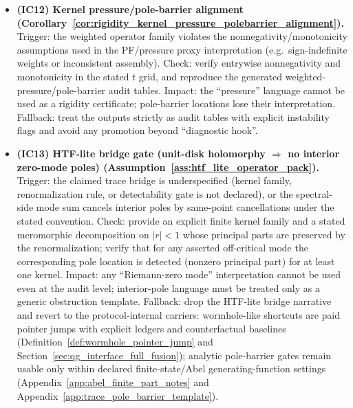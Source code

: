 \begin{itemize}
\item \textbf{(IC12) Kernel pressure/pole-barrier alignment (Corollary~\ref{cor:rigidity_kernel_pressure_polebarrier_alignment}).}
  Trigger: the weighted operator family violates the nonnegativity/monotonicity assumptions used in the PF/pressure proxy interpretation (e.g.\ sign-indefinite weights or inconsistent assembly).
  Check: verify entrywise nonnegativity and monotonicity in the stated $t$ grid, and reproduce the generated weighted-pressure/pole-barrier audit tables.
  Impact: the ``pressure'' language cannot be used as a rigidity certificate; pole-barrier locations lose their interpretation.
  Fallback: treat the outputs strictly as audit tables with explicit instability flags and avoid any promotion beyond ``diagnostic hook''.

\item \textbf{(IC13) HTF-lite bridge gate (unit-disk holomorphy $\Rightarrow$ no interior zero-mode poles) (Assumption~\ref{ass:htf_lite_operator_pack}).}
  Trigger: the claimed trace bridge is underspecified (kernel family, renormalization rule, or detectability gate is not declared), or the spectral-side mode sum cancels interior poles by same-point cancellations under the stated convention.
  Check: provide an explicit finite kernel family and a stated meromorphic decomposition on $|r|<1$ whose principal parts are preserved by the renormalization; verify that for any asserted off-critical mode the corresponding pole location is detected (nonzero principal part) for at least one kernel.
  Impact: any ``Riemann-zero mode'' interpretation cannot be used even at the audit level; interior-pole language must be treated only as a generic obstruction template.
  Fallback: drop the HTF-lite bridge narrative and revert to the protocol-internal carriers: wormhole-like shortcuts are paid pointer jumps with explicit ledgers and counterfactual baselines (Definition~\ref{def:wormhole_pointer_jump} and Section~\ref{sec:qg_interface_full_fusion}); analytic pole-barrier gates remain usable only within declared finite-state/Abel generating-function settings (Appendix~\ref{app:abel_finite_part_notes} and Appendix~\ref{app:trace_pole_barrier_template}).
\end{itemize}

